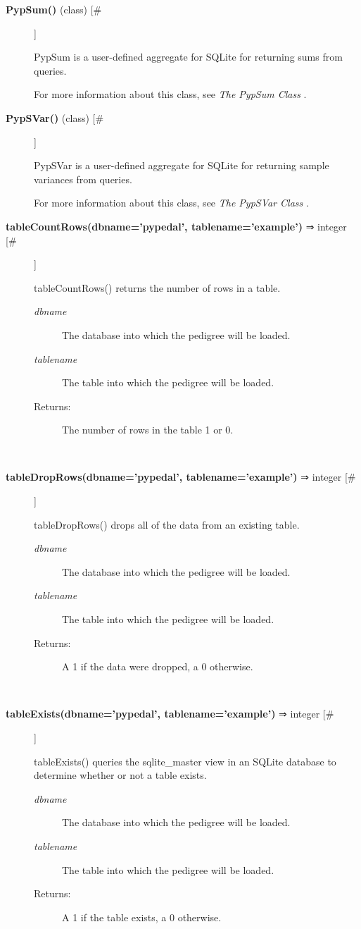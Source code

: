 \documentclass[10pt]{article}
\begin{document}
\begin{description}
\item[\textbf{PypSum()}
 (class) [\#]]

 PypSum is a user-defined aggregate for SQLite for returning sums from queries.


 For more information about this class, see \emph{The PypSum Class}
.

\item[\textbf{PypSVar()}
 (class) [\#]]

 PypSVar is a user-defined aggregate for SQLite for returning sample variances from queries.


 For more information about this class, see \emph{The PypSVar Class}
.

\item[\textbf{tableCountRows(dbname='pypedal', tablename='example')}
 ⇒ integer [\#]]

 tableCountRows() returns the number of rows in a table.
\begin{description}
\item[\emph{dbname}
] The database into which the pedigree will be loaded.
\item[\emph{tablename}
] The table into which the pedigree will be loaded.
\item[Returns:] The number of rows in the table 1 or 0.

\end{description}
\\ 

\item[\textbf{tableDropRows(dbname='pypedal', tablename='example')}
 ⇒ integer [\#]]

 tableDropRows() drops all of the data from an existing table.
\begin{description}
\item[\emph{dbname}
] The database into which the pedigree will be loaded.
\item[\emph{tablename}
] The table into which the pedigree will be loaded.
\item[Returns:] A 1 if the data were dropped, a 0 otherwise.

\end{description}
\\ 

\item[\textbf{tableExists(dbname='pypedal', tablename='example')}
 ⇒ integer [\#]]

 tableExists() queries the sqlite\_master view in an SQLite database to determine whether or not a table exists.
\begin{description}
\item[\emph{dbname}
] The database into which the pedigree will be loaded.
\item[\emph{tablename}
] The table into which the pedigree will be loaded.
\item[Returns:] A 1 if the table exists, a 0 otherwise.

\end{description}
\\ 


\end{description}
\end{document}
